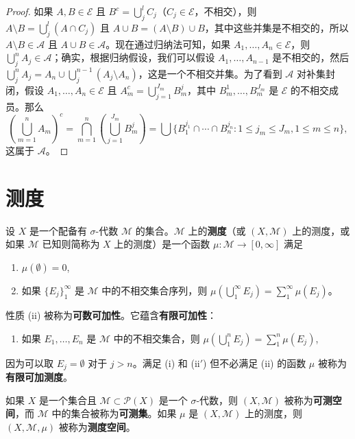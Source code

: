 \documentclass[lang=cn,10pt,thmcnt=section]{elegantbook}
\begin{document}
\begin{proof}
如果 $A, B \in \mathcal{E}$ 且 $B^c = \bigcup_{j}^{l} C_j$（$C_j \in \mathcal{E}$，不相交），则 $A \setminus B = \bigcup_{j}^{l} (A \cap C_j)$ 且 $A \cup B = (A \setminus B) \cup B$，其中这些并集是不相交的，所以 $A \setminus B \in \mathcal{A}$ 且 $A \cup B \in \mathcal{A}$。现在通过归纳法可知，如果 $A_1, \ldots, A_n \in \mathcal{E}$，则 $\bigcup_{j}^{n} A_j \in \mathcal{A}$；确实，根据归纳假设，我们可以假设 $A_1, \ldots, A_{n-1}$ 是不相交的，然后 $\bigcup_{j}^{n} A_j = A_n \cup \bigcup_{j}^{n-1} (A_j \setminus A_n)$，这是一个不相交并集。为了看到 $\mathcal{A}$ 对补集封闭，假设 $A_1, \ldots, A_n \in \mathcal{E}$ 且 $A_m^c = \bigcup_{j=1}^{J_m} B_m^j$，其中 $B_m^1, \ldots, B_m^{J_m}$ 是 $\mathcal{E}$ 的不相交成员。那么
\[\left(\bigcup_{m=1}^{n} A_m\right)^c = \bigcap_{m=1}^{n} \left(\bigcup_{j=1}^{J_m} B_m^j\right) = \bigcup\{B_1^{j_1} \cap \cdots \cap B_n^{j_n} : 1 \leq j_m \leq J_m, 1 \leq m \leq n\},\]
这属于 $\mathcal{A}$。
\end{proof}

\section{测度}

设 $X$ 是一个配备有 $\sigma$-代数 $\mathcal{M}$ 的集合。$\mathcal{M}$ 上的\textbf{测度}（或 $(X, \mathcal{M})$ 上的测度，或如果 $\mathcal{M}$ 已知则简称为 $X$ 上的测度）是一个函数 $\mu : \mathcal{M} \to [0, \infty]$ 满足

\begin{enumerate}[label=\roman*.]
\item $\mu(\emptyset) = 0$,
\item 如果 $\{E_j\}_1^\infty$ 是 $\mathcal{M}$ 中的不相交集合序列，则 $\mu(\bigcup_{1}^{\infty} E_j) = \sum_{1}^{\infty} \mu(E_j)$。
\end{enumerate}

性质 (ii) 被称为\textbf{可数可加性}。它蕴含\textbf{有限可加性}：

\begin{enumerate}[label=\roman*$'$.]
\item 如果 $E_1, \ldots, E_n$ 是 $\mathcal{M}$ 中的不相交集合，则 $\mu(\bigcup_{1}^{n} E_j) = \sum_{1}^{n} \mu(E_j)$,
\end{enumerate}

因为可以取 $E_j = \emptyset$ 对于 $j > n$。满足 (i) 和 (ii$'$) 但不必满足 (ii) 的函数 $\mu$ 被称为\textbf{有限可加测度}。

如果 $X$ 是一个集合且 $\mathcal{M} \subset \mathcal{P}(X)$ 是一个 $\sigma$-代数，则 $(X, \mathcal{M})$ 被称为\textbf{可测空间}，而 $\mathcal{M}$ 中的集合被称为\textbf{可测集}。如果 $\mu$ 是 $(X, \mathcal{M})$ 上的测度，则 $(X, \mathcal{M}, \mu)$ 被称为\textbf{测度空间}。
\end{document}
